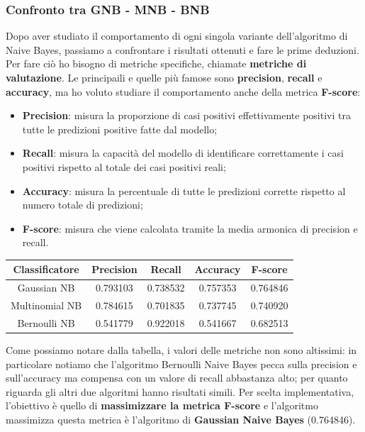 \documentclass{article}
\begin{document}
\begin{titlepage}
        \subsubsection{Confronto tra GNB - MNB - BNB}
        Dopo aver studiato il comportamento di ogni singola variante dell'algoritmo di Naive Bayes, passiamo a confrontare i risultati ottenuti e fare le prime deduzioni. Per fare ciò ho bisogno di metriche specifiche, chiamate \textbf{metriche di valutazione}. Le principaili e quelle più famose sono \textbf{precision}, \textbf{recall} e \textbf{accuracy}, ma ho voluto studiare il comportamento anche della metrica \textbf{F-score}:
        \begin{itemize}
            \item \textbf{Precision}:  misura la proporzione di casi positivi effettivamente positivi
            tra tutte le predizioni positive fatte dal modello;
            \item \textbf{Recall}: misura la capacità del modello di identificare correttamente i casi
            positivi rispetto al totale dei casi positivi reali;
            \item \textbf{Accuracy}: misura la percentuale di tutte le predizioni corrette rispetto al numero totale di predizioni;
            \item \textbf{F-score}: misura che viene calcolata tramite la media armonica di precision e recall.
        \end{itemize}
        \newpage
        \begin{center}
        \begin{tabular}{|c|c|c|c|c|}
            \hline
            \textbf{Classificatore} & \textbf{Precision} & \textbf{Recall} & \textbf{Accuracy}& \textbf{F-score}\\ \hline
            Gaussian NB & 0.793103 & 0.738532 & 0.757353 & 0.764846\\ \hline
            Multinomial NB & 0.784615 & 0.701835 & 0.737745 & 0.740920\\ \hline
            Bernoulli NB & 0.541779 & 0.922018 & 0.541667 & 0.682513\\ \hline
        \end{tabular}
        \end{center}

        Come possiamo notare dalla tabella, i valori delle metriche non sono altissimi: in particolare notiamo che l'algoritmo Bernoulli Naive Bayes pecca sulla precision e sull'accuracy ma compensa con un valore di recall abbastanza alto; per quanto riguarda gli altri due algoritmi hanno risultati simili. Per scelta implementativa, l'obiettivo è quello di \textbf{massimizzare la metrica F-score} e l'algoritmo massimizza questa metrica è l'algoritmo di \textbf{Gaussian Naive Bayes} (0.764846). 


\end{titlepage}
\end{document}
